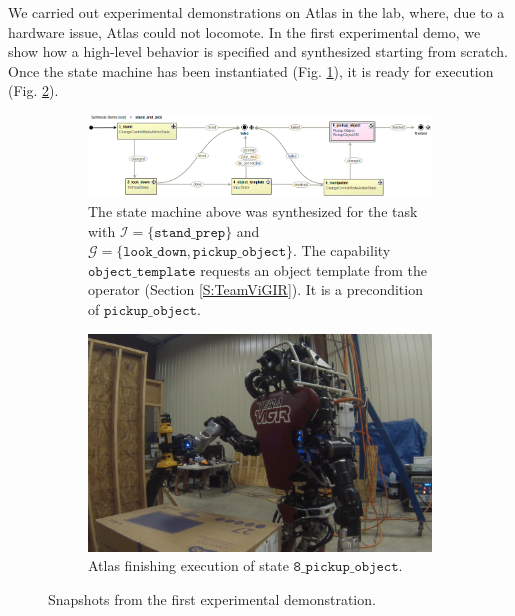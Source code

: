 
We carried out experimental demonstrations on Atlas in the lab, where, due to a hardware issue, Atlas could not locomote.
In the first experimental demo, we show how a high-level behavior is specified and synthesized starting from scratch.
Once the state machine has been instantiated (Fig. \ref{Fig:stand_and_pick_sm}), it is ready for execution (Fig. \ref{Fig:stand_and_pick_gopro}).

\begin{figure}[t]
	\centering
	\begin{subfigure}[b]{0.99\columnwidth}
	\includegraphics[width=0.99\columnwidth,clip]{./img/stand_and_pick_sm.png}
	\caption{
	The state machine above was synthesized for the task with $\mathcal{I} = \{ \mathtt{stand\_prep} \}$ and $\mathcal{G} = \{ \mathtt{look\_down}, \mathtt{pickup\_object} \}$.
	The capability $\mathtt{object\_template}$ requests an object template from the operator (Section \ref{S:TeamViGIR}).
	It is a precondition of $\mathtt{pickup\_object}$.
	}
	\label{Fig:stand_and_pick_sm}
	\end{subfigure}
	
	\vspace{4 pt}
	\begin{subfigure}[b]{0.95\columnwidth}
	\includegraphics[width=0.99\columnwidth, clip]{./img/stand_and_pick_gopro.png}
	\caption{Atlas finishing execution of state $\mathtt{8\_pickup\_object}$.
	} 
	\label{Fig:stand_and_pick_gopro}
	\end{subfigure}
	\caption{
	Snapshots from the first experimental demonstration.
	}
	\label{Fig:stand_and_pick_demo}
	\vspace{-10 pt}
\end{figure}

